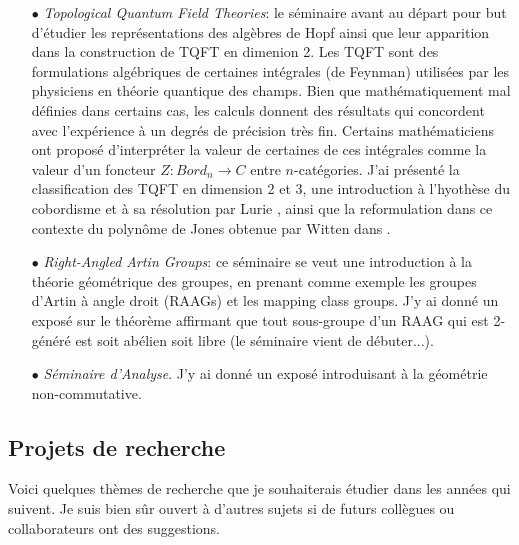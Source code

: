 \documentclass[a4paper,11pt]{article}
\begin{document}
\begin{itemize}
\item[$\bullet$] \textit{Topological Quantum Field Theories}: le s\'eminaire avant au d\'epart pour but d'\'etudier les repr\'esentations des alg\`ebres de Hopf ainsi que leur apparition dans la construction de TQFT en dimenion 2. Les TQFT sont des formulations alg\'ebriques de certaines int\'egrales (de Feynman) utilis\'ees par les physiciens en th\'eorie quantique des champs. Bien que math\'ematiquement mal d\'efinies dans certains cas, les calculs donnent des r\'esultats qui concordent avec l'exp\'erience \`a un degr\'es de pr\'ecision tr\`es fin. Certains math\'ematiciens ont propos\'e d'interpr\'eter la valeur de certaines de ces int\'egrales comme la valeur d'un foncteur $Z : Bord_n \rightarrow C$ entre $n$-cat\'egories.  J'ai pr\'esent\'e la classification des TQFT en dimension 2 et 3, une introduction \`a l'hyoth\`ese du cobordisme et \`a sa r\'esolution par Lurie \cite{Lurie}, ainsi que la reformulation dans ce contexte du polyn\^ome de Jones obtenue par Witten dans \cite{WittenJones}.\\

\item[$\bullet$] \textit{Right-Angled Artin Groups}: ce s\'eminaire se veut une introduction \`a la th\'eorie g\'eom\'etrique des groupes, en prenant comme exemple les groupes d'Artin \`a angle droit (RAAGs) et les mapping class groups. J'y ai donn\'e un expos\'e sur le th\'eor\`eme affirmant que tout sous-groupe d'un RAAG qui est 2-g\'en\'er\'e est soit ab\'elien soit libre (le s\'eminaire vient de d\'ebuter...).\\

\item[$\bullet$] \textit{S\'eminaire d'Analyse}. J'y ai donn\'e un expos\'e introduisant \`a la g\'eom\'etrie non-commutative.
\end{itemize}

\subsection*{Projets de recherche}

Voici quelques th\`emes de recherche que je souhaiterais \'etudier dans les ann\'ees qui suivent. Je suis bien s\^ur ouvert \`a d'autres sujets si de futurs coll\`egues ou collaborateurs ont des suggestions.\\
\end{document}
